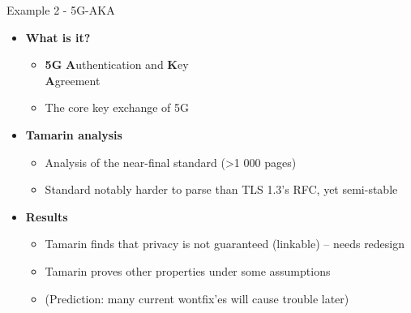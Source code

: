 \documentclass[11pt,aspectratio=169]{beamer}
\begin{document}
\begin{frame}[fragile]{Example 2 - 5G-AKA}
    \begin{itemize}
        \item \textbf{What is it?}
        \begin{itemize}
            \item \textbf{5G} \textbf{A}uthentication and \textbf{K}ey\\
                  \textbf{A}greement
            \item The core key exchange of 5G
        \end{itemize}
        \item \textbf{Tamarin analysis}
        \begin{itemize}
            \item Analysis of the near-final standard (>1 000 pages)
            \item Standard notably harder to parse than TLS 1.3's RFC, yet 
                  semi-stable
        \end{itemize}
        \item \textbf{Results}
        \begin{itemize}
            \item Tamarin finds that privacy is not guaranteed (linkable)
                  -- needs redesign
            \item Tamarin proves other properties under some assumptions
            \item (Prediction: many current wontfix'es will cause trouble later)
        \end{itemize}
    \end{itemize}
\end{frame}
\end{document}
